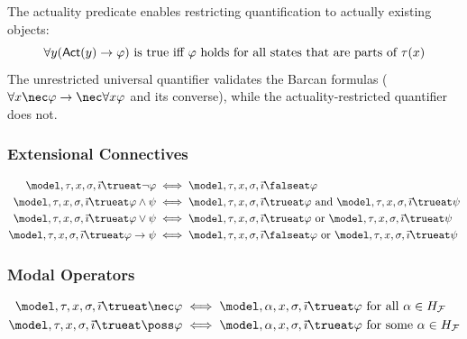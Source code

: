 \documentclass[../LogosReference.tex]{subfiles}
\begin{document}
\begin{remark}
	The actuality predicate enables restricting quantification to actually existing objects:
	\[
		\forall y(\mathsf{Act}(y) \to \varphi) \text{ is true iff } \varphi \text{ holds for all states that are parts of } \tau(x)
	\]
	The unrestricted universal quantifier validates the Barcan formulas ($\forall x \nec\metaA \to \nec\forall x\metaA$ and its converse), while the actuality-restricted quantifier does not.
\end{remark}

\subsubsection{Extensional Connectives}

\begin{definition}\label{def:extensional-truth}
	\begin{align}
		\model, \history, x, \assignment, \tempindex \trueat \neg\metaA          & \iff \model, \history, x, \assignment, \tempindex \falseat \metaA                                                                            \\
		\model, \history, x, \assignment, \tempindex \trueat \metaA \land \metaB & \iff \model, \history, x, \assignment, \tempindex \trueat \metaA \text{ and } \model, \history, x, \assignment, \tempindex \trueat \metaB   \\
		\model, \history, x, \assignment, \tempindex \trueat \metaA \lor \metaB  & \iff \model, \history, x, \assignment, \tempindex \trueat \metaA \text{ or } \model, \history, x, \assignment, \tempindex \trueat \metaB    \\
		\model, \history, x, \assignment, \tempindex \trueat \metaA \to \metaB   & \iff \model, \history, x, \assignment, \tempindex \falseat \metaA \text{ or } \model, \history, x, \assignment, \tempindex \trueat \metaB
	\end{align}
\end{definition}

\subsubsection{Modal Operators}

\begin{definition}\label{def:modal-truth}
	\begin{align}
		\model, \history, x, \assignment, \tempindex \trueat \nec\metaA  & \iff \model, \alpha, x, \assignment, \tempindex \trueat \metaA \text{ for all } \alpha \in \historyspace  \\
		\model, \history, x, \assignment, \tempindex \trueat \poss\metaA & \iff \model, \alpha, x, \assignment, \tempindex \trueat \metaA \text{ for some } \alpha \in \historyspace
	\end{align}
\end{definition}
\end{document}
